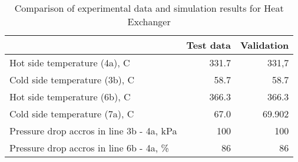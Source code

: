 \begin{table}
\label{tab:Comparison}
\caption{Comparison of experimental data and simulation results for Heat Exchanger}
\begin{center}
\begin{tabulary}{0.9\textwidth}{LRR}
\toprule
& Test data \cite{Iverson_2013}  & Validation \\
\midrule
Hot side temperature (4a), C & 331.7 & 331,7 \\
Cold side temperature (3b), C & 58.7 & 58.7 \\
Hot side temperature (6b), C & 366.3 & 366.3 \\
Cold side temperature (7a), C & 67.0 & 69.902 \\
Pressure drop accros in line 3b - 4a, kPa & 100 & 100 \\
Pressure drop accros in line 6b - 4a, \% & 86 & 86 \\
\bottomrule
\end{tabulary}
\end{center}
\end{table}
